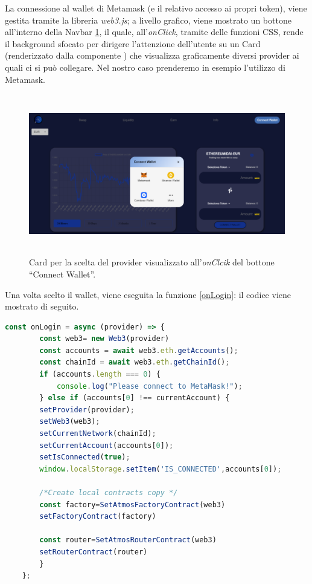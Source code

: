 La connessione al wallet di Metamask (e il relativo accesso ai propri token), viene gestita tramite la libreria \textit{web3.js}; a livello grafico, viene mostrato un bottone all'interno della Navbar \ref{navbar}, il quale, all'\textit{onClick}, tramite delle funzioni CSS, rende il background sfocato per dirigere l'attenzione dell'utente su un Card (renderizzato dalla componente ) che visualizza graficamente diversi provider ai quali ci si può collegare. Nel nostro caso prenderemo in esempio l'utilizzo di Metamask.

\begin{figure}[h]
    \centering
    \includegraphics[width=15cm,height=7cm]{Immagini/navbar.png}
    \caption[Scelta provider per la connessione alla Dapp]{Card per la scelta del provider visualizzato all'\textit{onClcik} del bottone “Connect Wallet”.}
    \label{navbar}
\end{figure}

Una volta scelto il wallet, viene eseguita la funzione \ref{onLogin}: il codice viene mostrato di seguito.
\begin{lstlisting}[caption={[\textcourier{onLogin()} Function]},language=jsx] 
const onLogin = async (provider) => {
        const web3= new Web3(provider)
        const accounts = await web3.eth.getAccounts();
        const chainId = await web3.eth.getChainId();
        if (accounts.length === 0) {
            console.log("Please connect to MetaMask!");
        } else if (accounts[0] !== currentAccount) {
        setProvider(provider);
        setWeb3(web3);
        setCurrentNetwork(chainId);
        setCurrentAccount(accounts[0]);
        setIsConnected(true);
        window.localStorage.setItem('IS_CONNECTED',accounts[0]);

        /*Create local contracts copy */
        const factory=SetAtmosFactoryContract(web3)
        setFactoryContract(factory)

        const router=SetAtmosRouterContract(web3)
        setRouterContract(router)
        }
    };        																			     -onLogin
\end{lstlisting}\makeatletter{}\makeatother
\label{onLogin}

